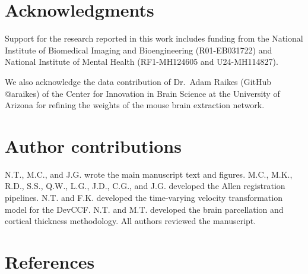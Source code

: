 \documentclass[
  12pt,
]{article}
\begin{document}
\clearpage

\section*{Acknowledgments}\label{acknowledgments}

Support for the research reported in this work includes funding from the
National Institute of Biomedical Imaging and Bioengineering
(R01-EB031722) and National Institute of Mental Health (RF1-MH124605 and
U24-MH114827).

We also acknowledge the data contribution of Dr.~Adam Raikes (GitHub
@araikes) of the Center for Innovation in Brain Science at the
University of Arizona for refining the weights of the mouse brain
extraction network.

\clearpage

\section*{Author contributions}\label{author-contributions}

N.T., M.C., and J.G. wrote the main manuscript text and figures. M.C.,
M.K., R.D., S.S., Q.W., L.G., J.D., C.G., and J.G. developed the Allen
registration pipelines. N.T. and F.K. developed the time-varying
velocity transformation model for the DevCCF. N.T. and M.T. developed
the brain parcellation and cortical thickness methodology. All authors
reviewed the manuscript. \clearpage

\section*{References}\label{references}
\end{document}
